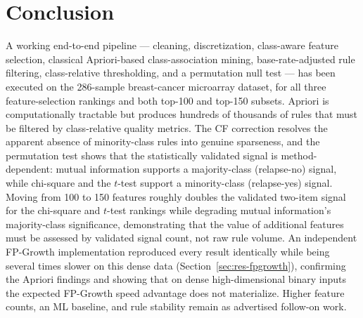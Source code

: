 \documentclass[twocolumn]{article}
\begin{document}
\section{Conclusion}

A working end-to-end pipeline --- cleaning, discretization, class-aware feature
selection, classical Apriori-based class-association mining, base-rate-adjusted
rule filtering, class-relative thresholding, and a permutation null test ---
has been executed on the 286-sample breast-cancer microarray dataset, for all
three feature-selection rankings and both top-100 and top-150 subsets. Apriori
is computationally tractable but produces hundreds of thousands of rules that
must be filtered by class-relative quality metrics. The CF correction resolves
the apparent absence of minority-class rules into genuine sparseness, and the
permutation test shows that the statistically validated signal is
method-dependent: mutual information supports a majority-class
(relapse-no) signal, while chi-square and the $t$-test support a
minority-class (relapse-yes) signal. Moving from 100 to 150 features roughly
doubles the validated two-item signal for the chi-square and $t$-test rankings
while degrading mutual information's majority-class significance, demonstrating
that the value of additional features must be assessed by validated signal
count, not raw rule volume. An independent FP-Growth implementation reproduced
every result identically while being several times slower on this dense data
(Section~\ref{sec:res-fpgrowth}), confirming the Apriori findings and showing
that on dense high-dimensional binary inputs the expected FP-Growth speed
advantage does not materialize. Higher feature counts, an ML baseline, and rule
stability remain as advertised follow-on work.



\end{document}
